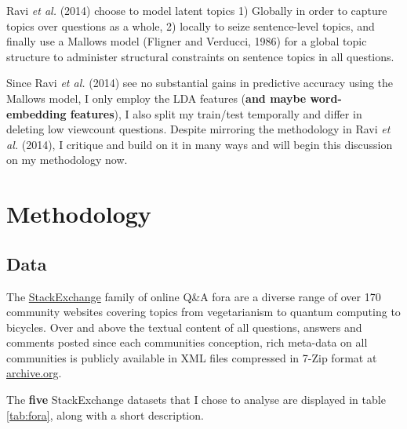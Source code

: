 \documentclass[11pt,preprint, authoryear]{article}
\numberwithin{equation}{section}
\begin{document}
Ravi \emph{et al.} (2014) choose to model latent topics 1) Globally in
order to capture topics over questions as a whole, 2) locally to seize
sentence-level topics, and finally use a Mallows model (Fligner and
Verducci, 1986) for a global topic structure to administer structural
constraints on sentence topics in all questions.

Since Ravi \emph{et al.} (2014) see no substantial gains in predictive
accuracy using the Mallows model, I only employ the LDA features
(\textbf{and maybe word-embedding features}), I also split my train/test
temporally and differ in deleting low viewcount questions. Despite
mirroring the methodology in Ravi \emph{et al.} (2014), I critique and
build on it in many ways and will begin this discussion on my
methodology now.

\newpage

\section{\texorpdfstring{Methodology
\label{Method}}{Methodology }}\label{methodology}

\subsection{\texorpdfstring{Data \label{Data}}{Data }}\label{data}

The \href{https://stackexchange.com/sites\#traffic}{StackExchange}
family of online Q\&A fora are a diverse range of over 170 community
websites covering topics from vegetarianism to quantum computing to
bicycles. Over and above the textual content of all questions, answers
and comments posted since each communities conception, rich meta-data on
all communities is publicly available in XML files compressed in 7-Zip
format at \href{http://archive.org/download/stackexchange}{archive.org}.

The \textbf{five} StackExchange datasets that I chose to analyse are
displayed in table \ref{tab:fora}, along with a short description.

\footnotesize
\end{document}
